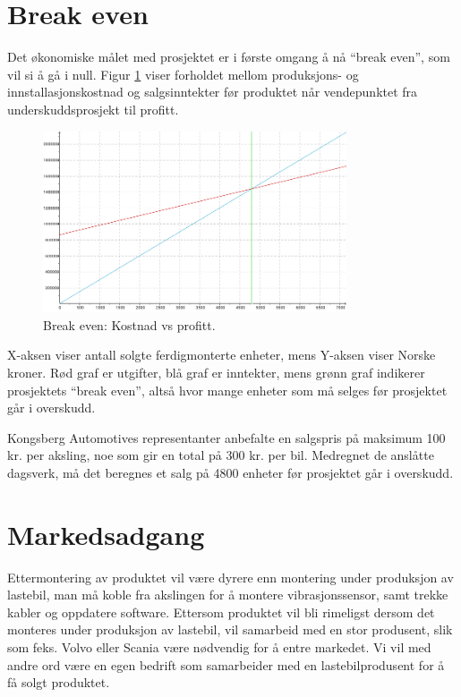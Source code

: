 \section{Break even}
Det økonomiske målet med prosjektet er i første omgang å nå ``break even'', 
som vil si å gå i null. Figur \ref{fig:breakeven} viser forholdet mellom 
produksjons- og innstallasjonskostnad og salgsinntekter før produktet når 
vendepunktet fra underskuddsprosjekt til profitt. 
	\newline
	\begin{figure}[H]
		\centering
		\includegraphics[width=0.80\textwidth]{images/break-even.png}
		\caption{Break even: Kostnad vs profitt.}
		\label{fig:breakeven}
	\end{figure}
X-aksen viser antall solgte ferdigmonterte enheter, mens Y-aksen viser 
Norske kroner. Rød graf er utgifter, blå graf er inntekter, mens grønn graf 
indikerer prosjektets ``break even'', altså hvor mange enheter som må selges 
før prosjektet går i overskudd.

Kongsberg Automotives representanter anbefalte en salgspris på maksimum 100 kr.
per aksling, noe som gir en total på 300 kr. per bil. Medregnet de anslåtte 
dagsverk, må det beregnes et salg på 4800 enheter før prosjektet går i overskudd.

\section{Markedsadgang}
Ettermontering av produktet vil være dyrere enn montering under produksjon av 
lastebil, man må koble fra akslingen for å montere vibrasjonssensor, samt 
trekke kabler og oppdatere software. Ettersom produktet vil bli rimeligst 
dersom det monteres under produksjon av lastebil, vil  samarbeid med en stor 
produsent, slik som feks. Volvo eller Scania være nødvendig for å entre markedet. Vi vil med andre ord være en egen bedrift som samarbeider med en lastebilprodusent for å få solgt produktet.

